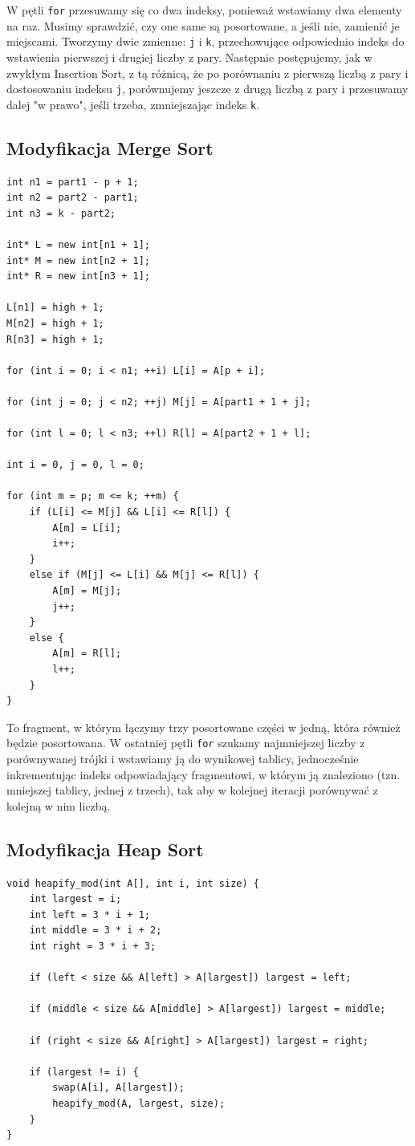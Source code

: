 \documentclass{article}
\begin{document}
W pętli \texttt{for} przesuwamy się co dwa indeksy, ponieważ wstawiamy dwa elementy na raz. Musimy sprawdzić, czy one same są posortowane, a jeśli nie, zamienić je miejscami. Tworzymy dwie zmienne: \texttt{j} i \texttt{k}, przechowujące odpowiednio indeks do wstawienia pierwszej i drugiej liczby z pary. Następnie postępujemy, jak w zwykłym Insertion Sort, z tą różnicą, że po porównaniu z pierwszą liczbą z pary i dostosowaniu indeksu \texttt{j}, porównujemy jeszcze z drugą liczbą z pary i przesuwamy dalej "w prawo", jeśli trzeba, zmniejszając indeks \texttt{k}.

\subsection{Modyfikacja Merge Sort}

\begin{verbatim}
int n1 = part1 - p + 1;
int n2 = part2 - part1;
int n3 = k - part2;

int* L = new int[n1 + 1];
int* M = new int[n2 + 1];
int* R = new int[n3 + 1];

L[n1] = high + 1;
M[n2] = high + 1;
R[n3] = high + 1;

for (int i = 0; i < n1; ++i) L[i] = A[p + i];

for (int j = 0; j < n2; ++j) M[j] = A[part1 + 1 + j];

for (int l = 0; l < n3; ++l) R[l] = A[part2 + 1 + l];

int i = 0, j = 0, l = 0;

for (int m = p; m <= k; ++m) {
    if (L[i] <= M[j] && L[i] <= R[l]) {
        A[m] = L[i];
        i++;
    }
    else if (M[j] <= L[i] && M[j] <= R[l]) {
        A[m] = M[j];
        j++;
    }
    else {
        A[m] = R[l];
        l++;
    }
}
\end{verbatim}

To fragment, w którym łączymy trzy posortowane części w jedną, która również będzie posortowana. W ostatniej pętli \texttt{for} szukamy najmniejszej liczby z porównywanej trójki i wstawiamy ją do wynikowej tablicy, jednocześnie inkrementując indeks odpowiadający fragmentowi, w którym ją znaleziono (tzn. mniejszej tablicy, jednej z trzech), tak aby w kolejnej iteracji porównywać z kolejną w nim liczbą.

\subsection{Modyfikacja Heap Sort}

\begin{verbatim}
void heapify_mod(int A[], int i, int size) {
    int largest = i;
    int left = 3 * i + 1;
    int middle = 3 * i + 2;
    int right = 3 * i + 3;
    
    if (left < size && A[left] > A[largest]) largest = left;

    if (middle < size && A[middle] > A[largest]) largest = middle;

    if (right < size && A[right] > A[largest]) largest = right;

    if (largest != i) {
        swap(A[i], A[largest]);
        heapify_mod(A, largest, size);
    }
}
\end{verbatim}
\end{document}
